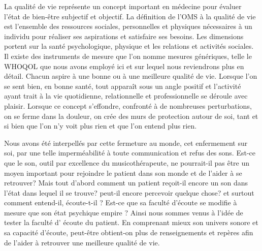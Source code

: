 La qualité de vie représente un concept important en médecine pour évaluer l'état de bien-être subjectif
et objectif. La définition de l'OMS à la  qualité de vie est l'ensemble des ressources sociales, 
personnelles et physiques nécessaires à un individu pour réaliser ses aspirations et satisfaire ses 
besoins. Les dimensions portent sur la santé psychologique, physique et les relations et activités 
sociales. Il existe des instruments de mesure que l'on nomme mesures génériques, telle le WHOQOL que 
nous avons employé ici et sur lequel nous reviendrons plus en détail.
Chacun aspire à une bonne ou à une meilleure qualité de vie.
 Lorsque l'on se 
sent bien, en bonne santé, tout 
apparaît sous un angle positif et l'activité ayant trait à la vie quotidienne, relationnelle  et 
professionnelle se 
déroule avec plaisir.
Lorsque ce concept s'effondre, confronté à de nombreuses
perturbations, on se ferme dans la douleur, on crée des murs de protection autour de soi, 
tant et si bien que l'on n'y voit plus rien et que l'on entend plus rien.

Nous avons été interpellés par cette fermeture au monde, cet enfermement sur soi, par une telle  
imperméabilité à 
 toute 
 communication et refus des sons. Est-ce que le son, outil par excellence du musicothérapeute, ne 
 pourrait-il pas être un moyen important pour rejoindre le patient dans son monde et de  l'aider à se 
 retrouver?  Mais tout 
 d'abord comment un patient reçoit-il encore un son dans l'état dans lequel il se trouve? peut-il encore  
 percevoir quelque chose? et surtout comment entend-il, écoute-t-il ?   %
   Est-ce que sa faculté d'écoute se modifie à mesure que  son  état psychique empire ? 
  Ainsi nous  sommes venus 
  à l'idée de tester la faculté d' écoute du patient. En comprenant mieux son univers sonore et sa capacité 
  d'écoute, peut-être obtient-on plus de renseignements et repères afin de l'aider à retrouver  une 
  meilleure qualité de vie.

